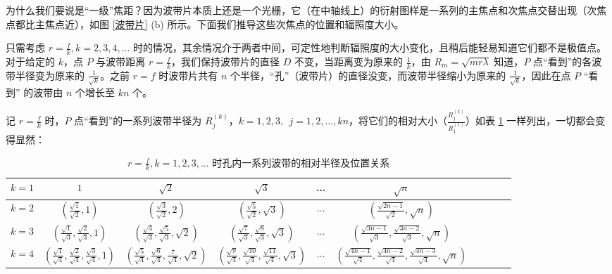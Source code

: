 \documentclass[UTF8]{report}
\theoremstyle{MyLineTheoremStyle} %
\theoremstyle{MyBlockTheoremStyle} %
\theoremstyle{MySubsubsectionStyle} %
\begin{document}
为什么我们要说是“一级”焦距？因为波带片本质上还是一个光栅，它（在中轴线上）的衍射图样是一系列的主焦点和次焦点交替出现（次焦点都比主焦点近），如图 \ref{波带片} (b) 所示。下面我们推导这些次焦点的位置和辐照度大小。

只需考虑 $r = \frac{f}{k}, k = 2, 3, 4, ...$ 时的情况，其余情况介于两者中间，可定性地判断辐照度的大小变化，且稍后能轻易知道它们都不是极值点。对于给定的 $k$，点 $P$ 与波带距离 $r = \frac{f}{k}$，我们保持波带片的直径 $D$ 不变，当距离变为原来的 $\frac{1}{k}$，由 $R_m = \sqrt{mr\lambda}$ 知道，$P$ 点“看到”的各波带半径变为原来的 $\frac{1}{\sqrt{k}}$。之前 $r = f$ 时波带片共有 $n$ 个半径，“孔”（波带片）的直径没变，而波带半径缩小为原来的 $\frac{1}{\sqrt{k}}$，因此在点 $P$ “看到” 的波带由 $n$ 个增长至 $kn$ 个。

记 $r = \frac{f}{k}$ 时，$P$ 点“看到”的一系列波带半径为 $R_j^{(k)}$，$k = 1, 2, 3, \ \ j = 1, 2, ..., kn$，将它们的相对大小（$\frac{R_j^{(k)}}{R_1^(1)}$）如表 \ref{孔内不同波带的半径及位置关系} 一样列出，一切都会变得显然：
\begin{table}[H]\centering
    \caption{$r = \frac{f}{k}, k = 1, 2, 3, ... $ 时孔内一系列波带的相对半径及位置关系}
    \label{孔内不同波带的半径及位置关系}
\begin{tabular}{cccccccccc}\toprule
    $k = 1$ & $1$ & $\sqrt{2}$ & $\sqrt{3}$  & ... & $\sqrt{n}$ \\
    \midrule
    $k = 2$ & $(\frac{\sqrt{1}}{\sqrt{2}}, 1)$ & $(\frac{\sqrt{3}}{\sqrt{2}}, 2)$ &  $(\frac{\sqrt{5}}{\sqrt{2}}, \sqrt{3})$  & ... & $(\frac{\sqrt{2n -1 }}{\sqrt{2}}, \sqrt{n})$  \\
    $k = 3$ &  $(\frac{\sqrt{1}}{\sqrt{3}}, \frac{\sqrt{2}}{\sqrt{3}}, 1)$ & $(\frac{\sqrt{4}}{\sqrt{3}}, \frac{\sqrt{5}}{\sqrt{3}}, \sqrt{2})$ &  $(\frac{\sqrt{7}}{\sqrt{3}}, \frac{\sqrt{8}}{\sqrt{3}}, \sqrt{3})$  & ... & $(\frac{\sqrt{3n -1 }}{\sqrt{3}}, \frac{\sqrt{3n-2}}{\sqrt{3}}, \sqrt{n})$   \\
    $k = 4$ &  $(\frac{\sqrt{1}}{\sqrt{4}}, \frac{\sqrt{2}}{\sqrt{4}}, \frac{\sqrt{3}}{\sqrt{4}}, 1)$ & $(\frac{\sqrt{5}}{\sqrt{4}}, \frac{\sqrt{6}}{\sqrt{4}}, \frac{7}{\sqrt{4}}, \sqrt{2})$ &  $(\frac{\sqrt{9}}{\sqrt{4}}, \frac{\sqrt{10}}{\sqrt{4}}, \frac{\sqrt{11}}{\sqrt{4}}, \sqrt{3})$  & ... & $(\frac{\sqrt{4n -1 }}{\sqrt{4}}, \frac{\sqrt{4n-2}}{\sqrt{4}}, \frac{\sqrt{4n-3}}{\sqrt{4}}, \sqrt{n})$   \\
    \bottomrule
\end{tabular}
\end{table}
\end{document}
